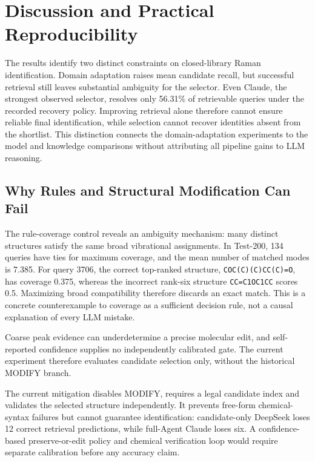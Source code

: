 \section{Discussion and Practical Reproducibility}
The results identify two distinct constraints on closed-library Raman identification. Domain adaptation raises mean candidate recall, but successful retrieval still leaves substantial ambiguity for the selector. Even Claude, the strongest observed selector, resolves only 56.31\% of retrievable queries under the recorded recovery policy. Improving retrieval alone therefore cannot ensure reliable final identification, while selection cannot recover identities absent from the shortlist. This distinction connects the domain-adaptation experiments to the model and knowledge comparisons without attributing all pipeline gains to LLM reasoning.
\subsection{Why Rules and Structural Modification Can Fail}\label{sec:limits}
The rule-coverage control reveals an ambiguity mechanism: many distinct structures satisfy the same broad vibrational assignments. In Test-200, 134 queries have ties for maximum coverage, and the mean number of matched modes is 7.385. For query 3706, the correct top-ranked structure, \texttt{COC(C)(C)CC(C)=O}, has coverage 0.375, whereas the incorrect rank-six structure \texttt{CC=C1OC1CC} scores 0.5. Maximizing broad compatibility therefore discards an exact match. This is a concrete counterexample to coverage as a sufficient decision rule, not a causal explanation of every LLM mistake.

Coarse peak evidence can underdetermine a precise molecular edit, and self-reported confidence supplies no independently calibrated gate. The current experiment therefore evaluates candidate selection only, without the historical MODIFY branch.

The current mitigation disables MODIFY, requires a legal candidate index and validates the selected structure independently. It prevents free-form chemical-syntax failures but cannot guarantee identification: candidate-only DeepSeek loses 12 correct retrieval predictions, while full-Agent Claude loses six. A confidence-based preserve-or-edit policy and chemical verification loop would require separate calibration before any accuracy claim.

